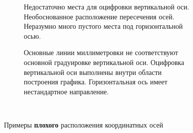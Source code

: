 \begin{itemize}
\begin{figure}[h]
\begin{subfigure}[t]{0.46\tw}
        \caption{Недостаточно места для оцифровки вертикальной оси.  Необоснованное расположение пересечения осей. Неразумно много пустого места под горизонтальной осью.}    
    \end{subfigure}
    \hfill
    \begin{subfigure}[t]{0.46\tw}
        \centering
        \caption{Основные линии миллиметровки не соответствуют основной градуировке вертикальной оси. Оцифровка вертикальной оси выполнены внутри области построения графика. Горизонтальная ось имеет нестандартное направление.}
    \end{subfigure}
    \hfill \!\!\!~
    
    \caption{Примеры {\bfseries плохого} расположения координатных осей}
    \label{pic:bad-axis-location}
\end{figure}
    

\end{itemize}
